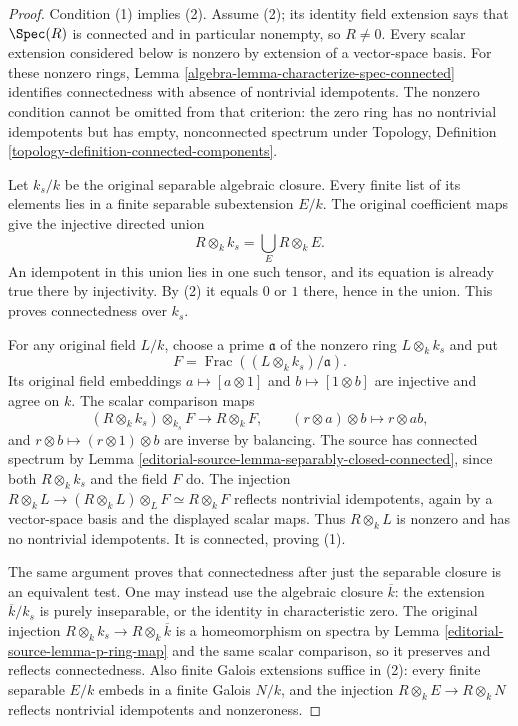 \begin{proof}
Condition (1) implies (2).
Assume (2); its identity field
extension says that $\Spec(R)$
is connected and in particular
nonempty, so $R\neq0$.
Every scalar extension considered
below is nonzero by extension
of a vector-space basis.
For these nonzero rings, Lemma
\ref{algebra-lemma-characterize-spec-connected}
identifies connectedness with
absence of nontrivial idempotents.
The nonzero condition cannot be
omitted from that criterion:
the zero ring has no nontrivial
idempotents but has empty,
nonconnected spectrum under
Topology, Definition
\ref{topology-definition-connected-components}.

Let $k_s/k$ be the original
separable algebraic closure.
Every finite list of its
elements lies in a finite
separable subextension $E/k$.
The original coefficient maps
give the injective directed union
$$
R\otimes_k k_s=\bigcup_E R\otimes_k E.
$$
An idempotent in this union
lies in one such tensor, and
its equation is already true
there by injectivity. By (2)
it equals $0$ or $1$ there,
hence in the union. This
proves connectedness over $k_s$.

For any original field $L/k$,
choose a prime $\mathfrak a$
of the nonzero ring $L\otimes_k k_s$
and put
$$
F=\operatorname{Frac}((L\otimes_k k_s)/\mathfrak a).
$$
Its original field embeddings
$a\mapsto[a\otimes1]$ and
$b\mapsto[1\otimes b]$ are
injective and agree on $k$.
The scalar comparison maps
$$
(R\otimes_k k_s)\otimes_{k_s}F\longrightarrow R\otimes_k F,
\qquad(r\otimes a)\otimes b\longmapsto r\otimes ab,
$$
and $r\otimes b\mapsto(r\otimes1)\otimes b$
are inverse by balancing.
The source has connected
spectrum by Lemma
\ref{editorial-source-lemma-separably-closed-connected},
since both $R\otimes_k k_s$
and the field $F$ do.
The injection
$R\otimes_k L\to(R\otimes_k L)\otimes_L F\simeq R\otimes_k F$
reflects nontrivial idempotents,
again by a vector-space basis
and the displayed scalar maps.
Thus $R\otimes_k L$ is nonzero
and has no nontrivial idempotents.
It is connected, proving (1).

The same argument proves that
connectedness after just the
separable closure is an equivalent
test. One may instead use the
algebraic closure $\overline k$:
the extension $\overline k/k_s$
is purely inseparable, or the
identity in characteristic zero.
The original injection
$R\otimes_k k_s\to R\otimes_k\overline k$
is a homeomorphism on spectra
by Lemma \ref{editorial-source-lemma-p-ring-map}
and the same scalar comparison,
so it preserves and reflects
connectedness. Also finite Galois
extensions suffice in (2): every
finite separable $E/k$ embeds
in a finite Galois $N/k$, and
the injection $R\otimes_k E\to R\otimes_k N$
reflects nontrivial idempotents
and nonzeroness.


\end{proof}
